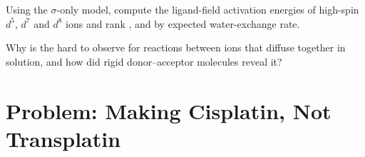 \begin{exercise}[$\star\star\star$]\label{exo:b3:complex-mechanisms:11}
Using the $\sigma$-only model, compute the ligand-field activation energies of
high-spin $d^5$, $d^7$ and $d^8$ ions and rank ,  and  by expected
water-exchange rate.
\end{exercise}

\begin{exercise}[$\star\star\star$]\label{exo:b3:complex-mechanisms:12}
Why is the  hard to observe for reactions between ions that
diffuse together in solution, and how did rigid donor--acceptor molecules reveal
it?
\end{exercise}

\section{Problem: Making Cisplatin, Not Transplatin}

